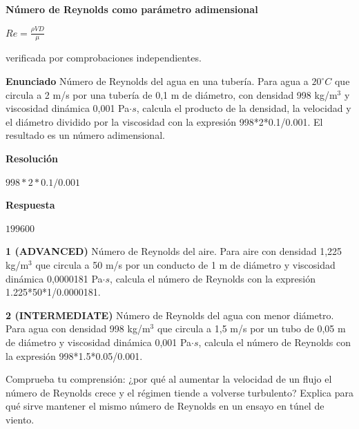 \documentclass{book}
\begin{document}
\begin{tcolorbox}[title={Derivaciones}, studiumdef, breakable]

\noindent\textbf{Número de Reynolds como parámetro adimensional}

\(Re = \frac{\rho V D}{\mu}\)

\noindent\footnotesize verificada por comprobaciones independientes.
\end{tcolorbox}

\begin{tcolorbox}[title={Problema resuelto}, studiumworked, breakable]

\noindent\textbf{Enunciado}
Número de Reynolds del agua en una tubería. Para agua a \(20 ^{\circ}C\) que circula a 2 m/s por una tubería de 0,1 m de diámetro, con densidad 998 kg/m\(^{3}\) y viscosidad dinámica 0,001 Pa\(\cdot s\), calcula el producto de la densidad, la velocidad y el diámetro dividido por la viscosidad con la expresión 998*2*0.1/0.001. El resultado es un número adimensional.

\noindent\textbf{Resolución}

\(998*2*0.1/0.001\)

\noindent\textbf{Respuesta}

\(199600\)
\end{tcolorbox}

\begin{tcolorbox}[title={Ejercicios}, studiumworked, breakable]

\noindent\textbf{1 (ADVANCED)}
Número de Reynolds del aire. Para aire con densidad 1,225 kg/m\(^{3}\) que circula a 50 m/s por un conducto de 1 m de diámetro y viscosidad dinámica 0,0000181 Pa\(\cdot s\), calcula el número de Reynolds con la expresión 1.225*50*1/0.0000181.

\noindent\textbf{2 (INTERMEDIATE)}
Número de Reynolds del agua con menor diámetro. Para agua con densidad 998 kg/m\(^{3}\) que circula a 1,5 m/s por un tubo de 0,05 m de diámetro y viscosidad dinámica 0,001 Pa\(\cdot s\), calcula el número de Reynolds con la expresión 998*1.5*0.05/0.001.
\end{tcolorbox}

\begin{tcolorbox}[title={Autoficha}, studiumcheck, breakable]

Comprueba tu comprensión: ¿por qué al aumentar la velocidad de un flujo el número de Reynolds crece y el régimen tiende a volverse turbulento? Explica para qué sirve mantener el mismo número de Reynolds en un ensayo en túnel de viento.
\end{tcolorbox}
\end{document}
